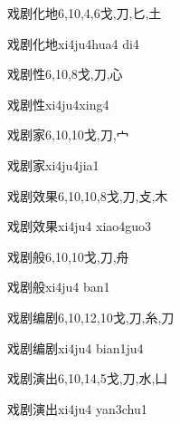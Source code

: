 \begin{Entry}{戏剧化地}{6,10,4,6}{⼽,⼑,⼔,⼟}
  \begin{Phonetics}{戏剧化地}{xi4ju4hua4 di4}
  \end{Phonetics}
\end{Entry}

\begin{Entry}{戏剧性}{6,10,8}{⼽,⼑,⼼}
  \begin{Phonetics}{戏剧性}{xi4ju4xing4}
  \end{Phonetics}
\end{Entry}

\begin{Entry}{戏剧家}{6,10,10}{⼽,⼑,⼧}
  \begin{Phonetics}{戏剧家}{xi4ju4jia1}
  \end{Phonetics}
\end{Entry}

\begin{Entry}{戏剧效果}{6,10,10,8}{⼽,⼑,⽁,⽊}
  \begin{Phonetics}{戏剧效果}{xi4ju4 xiao4guo3}
  \end{Phonetics}
\end{Entry}

\begin{Entry}{戏剧般}{6,10,10}{⼽,⼑,⾈}
  \begin{Phonetics}{戏剧般}{xi4ju4 ban1}
  \end{Phonetics}
\end{Entry}

\begin{Entry}{戏剧编剧}{6,10,12,10}{⼽,⼑,⽷,⼑}
  \begin{Phonetics}{戏剧编剧}{xi4ju4 bian1ju4}
  \end{Phonetics}
\end{Entry}

\begin{Entry}{戏剧演出}{6,10,14,5}{⼽,⼑,⽔,⼐}
  \begin{Phonetics}{戏剧演出}{xi4ju4 yan3chu1}
  \end{Phonetics}
\end{Entry}

